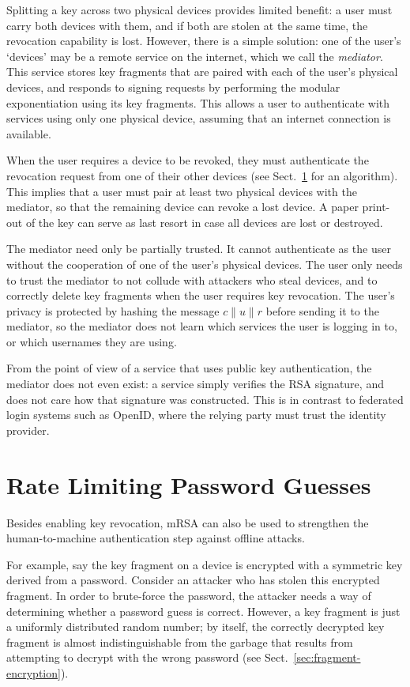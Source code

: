 \documentclass{llncs}
\newcommand*{\concat}{\mathbin{\|}}
\begin{document}
Splitting a key across two physical devices provides limited benefit: a user must carry both devices
with them, and if both are stolen at the same time, the revocation capability is lost. However,
there is a simple solution: one of the user's `devices' may be a remote service on the internet,
which we call the \emph{mediator}. This service stores key fragments that are paired with each of
the user's physical devices, and responds to signing requests by performing the modular
exponentiation using its key fragments. This allows a user to authenticate with services using only
one physical device, assuming that an internet connection is available.

When the user requires a device to be revoked, they must authenticate the revocation request from
one of their other devices (see Sect.~\ref{sec:ratelimit} for an algorithm). This implies that a
user must pair at least two physical devices with the mediator, so that the remaining device can
revoke a lost device. A paper print-out of the key can serve as last resort in case all devices are
lost or destroyed.

The mediator need only be partially trusted. It cannot authenticate as the user without the
cooperation of one of the user's physical devices. The user only needs to trust the mediator to not
collude with attackers who steal devices, and to correctly delete key fragments when the user
requires key revocation. The user's privacy is protected by hashing the message
$c \concat u \concat r$ before sending it to the mediator, so the mediator does not learn which
services the user is logging in to, or which usernames they are using.

From the point of view of a service that uses public key authentication, the mediator does not even
exist: a service simply verifies the RSA signature, and does not care how that
signature was constructed. This is in contrast to federated login systems such as OpenID, where the
relying party must trust the identity provider.

\section{Rate Limiting Password Guesses}\label{sec:ratelimit}

Besides enabling key revocation, mRSA can also be used to strengthen the human-to-machine
authentication step against offline attacks.

For example, say the key fragment on a device is encrypted with a symmetric key derived from a
password. Consider an attacker who has stolen this encrypted fragment. In order to brute-force the
password, the attacker needs a way of determining whether a password guess is correct. However, a
key fragment is just a uniformly distributed random number; by itself, the correctly decrypted key
fragment is almost indistinguishable from the garbage that results from attempting to decrypt with
the wrong password (see Sect.~\ref{sec:fragment-encryption}).
\end{document}
